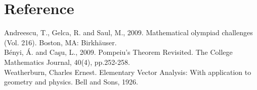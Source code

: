 \documentclass[12pt]{article}
\begin{document}
\section{Reference}

Andreescu, T., Gelca, R. and Saul, M., 2009. Mathematical olympiad challenges (Vol. 216). Boston, MA: Birkhäuser.\\
Bényi, Á. and Caşu, L., 2009. Pompeiu's Theorem Revisited. The College Mathematics Journal, 40(4), pp.252-258.\\
Weatherburn, Charles Ernest. Elementary Vector Analysis: With application to geometry and physics. Bell and Sons, 1926.
\end{document}
